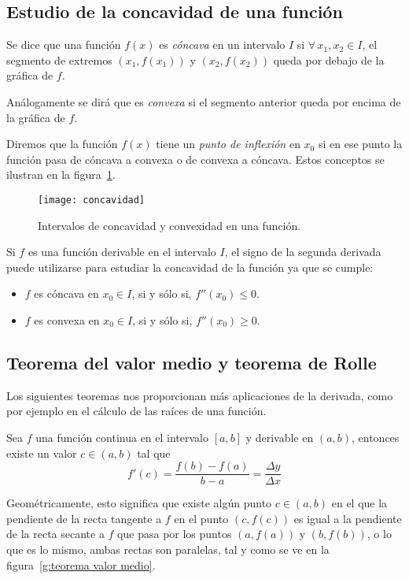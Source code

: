 \documentclass[a4paper]{article}
\begin{document}
\subsection*{Estudio de la concavidad de una función}
Se dice que una función $f(x)$ es \emph{cóncava} en un intervalo $I$ si $\forall\, x_1, x_2 \in I$, el segmento de extremos $(x_1,f(x_1))$ y $(x_2,f(x_2))$ queda por debajo de la gráfica de $f$.

Análogamente se dirá que es \emph{convexa} si el segmento anterior queda por encima de la gráfica de $f$. 

Diremos que la función $f(x)$ tiene un \emph{punto de inflexión} en $x_0$ si en ese punto la función pasa de cóncava a convexa o de convexa a cóncava. Estos conceptos se ilustran en la figura~\ref{g:concavidad}.

\begin{figure}[h!]
\centering
\texttt{[image: concavidad]}
\caption{Intervalos de concavidad y convexidad en una función.}
\label{g:concavidad}
\end{figure}


Si $f$ es una función derivable en el intervalo $I$, el signo de la segunda derivada puede utilizarse para estudiar la concavidad de la función ya que se cumple:
\begin{itemize}
\item $f$ es cóncava en $x_0\in I$, si y sólo si, $f''(x_0)\leq 0$.
\item $f$ es convexa en $x_0\in I$, si y sólo si, $f''(x_0)\geq 0$.
\end{itemize} 


\subsection*{Teorema del valor medio y teorema de Rolle}
Los siguientes teoremas nos proporcionan más aplicaciones de la derivada, como por ejemplo en el cálculo de las raíces de una función.

\begin{teorema}
Sea $f$ una función continua en el intervalo $[a,b]$ y derivable en $(a,b)$, entonces existe un valor $c\in(a,b)$ tal que 
\[
f'(c)=\frac{f(b)-f(a)}{b-a}=\frac{\Delta y}{\Delta x}
\]
\end{teorema}

Geométricamente, esto significa que existe algún punto $c\in(a,b)$ en el que la pendiente de la recta tangente a $f$ en el punto $(c,f(c))$ es igual a la pendiente de la recta secante a $f$ que pasa por los puntos $(a,f(a))$ y $(b,f (b))$, o lo que es lo mismo, ambas rectas son paralelas, tal y como se ve en la figura~\ref{g:teorema valor medio}.
\end{document}
